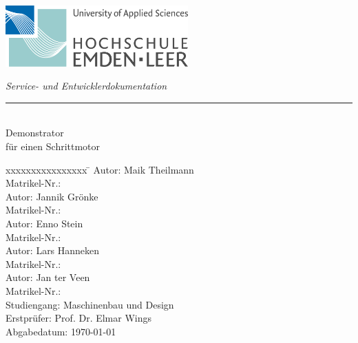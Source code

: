 %
%
%

\begin{titlepage}
    
    \begin{flushleft} 
        \includegraphics[width=7cm]{General/LogoHSEmdenLeer.jpg}
    \end{flushleft} 
    
    \begin{flushright}
        \vspace{2cm}
        \LARGE \textsl{Service- und Entwicklerdokumentation}\\
        \rule{0.6\textwidth}{0.4pt} ~\\
        \vspace{0.5cm}
        \textsf{\LARGE Demonstrator}\\
        \textsf{\LARGE für einen Schrittmotor}
    \end{flushright}
    
    \vspace{3cm}
    \large
    \begin{tabbing}
        xxxxxxxxxxxxxxxx \= \kill
        Autor:			\> Maik Theilmann \\
        Matrikel-Nr.:	 \\
        Autor:			\> Jannik Grönke \\
        Matrikel-Nr.:	 \\
        Autor:			\> Enno Stein \\
        Matrikel-Nr.:	 \\
        Autor:			\> Lars Hanneken \\
        Matrikel-Nr.:	 \\
        Autor:			\> Jan ter Veen \\
        Matrikel-Nr.:	 \\

        Studiengang: \> Maschinenbau und Design \\ [0.5cm]
        Erstprüfer: \> Prof. Dr. Elmar Wings \\
        Abgabedatum: \> \today \\
    \end{tabbing}
    

\end{titlepage}
